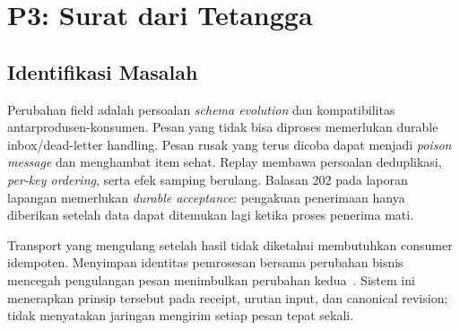 \chapter{P3: Surat dari Tetangga}
\section{Identifikasi Masalah}
Perubahan field adalah persoalan \emph{schema evolution} dan kompatibilitas antarprodusen-konsumen. Pesan yang tidak bisa diproses memerlukan durable inbox/dead-letter handling. Pesan rusak yang terus dicoba dapat menjadi \emph{poison message} dan menghambat item sehat. Replay membawa persoalan deduplikasi, \emph{per-key ordering}, serta efek samping berulang. Balasan 202 pada laporan lapangan memerlukan \emph{durable acceptance}: pengakuan penerimaan hanya diberikan setelah data dapat ditemukan lagi ketika proses penerima mati.

Transport yang mengulang setelah hasil tidak diketahui membutuhkan consumer idempoten. Menyimpan identitas pemrosesan bersama perubahan bisnis mencegah pengulangan pesan menimbulkan perubahan kedua~\cite{idempotent}. Sistem ini menerapkan prinsip tersebut pada receipt, urutan input, dan canonical revision; tidak menyatakan jaringan mengirim setiap pesan tepat sekali.

